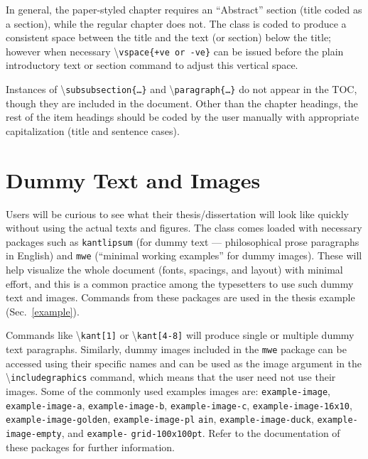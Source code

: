 \documentclass{article}
\newcommand\cmd[1]{\textbackslash\texttt{#1}}
\begin{document}
In general,  the paper-styled chapter requires an ``Abstract'' section (title coded as a section),  while the regular chapter does not.  The class is coded to produce a consistent space between the title and the text (or section) below the title; however when necessary \cmd{vspace\{+ve or -ve\}} can be issued before the plain introductory text or section command to adjust this vertical space.  

Instances of \cmd{subsubsection\{\ldots\}} and \cmd{paragraph\{\ldots\}} do not appear in the TOC, though they are included in the document.  Other than the chapter headings,  the rest of the item headings should be coded by the user manually with appropriate capitalization (title and sentence cases).

\section{Dummy Text and Images} 
Users will be curious to see what their thesis/dissertation will look like quickly without using the actual texts and figures. The class comes loaded with necessary packages such as \texttt{kantlipsum} (for dummy text --- philosophical prose paragraphs in English) and \texttt{mwe} (``minimal working examples'' for dummy images). These will help visualize the whole document (fonts, spacings, and layout) with minimal effort, and this is a common practice among the typesetters to use such dummy text and images. Commands from these packages are used in the thesis example (Sec.~\ref{example}).

Commands like \cmd{kant[1]} or \cmd{kant[4-8]} will produce single or multiple dummy text paragraphs. Similarly, dummy images included in the \texttt{mwe} package can be accessed using their specific names and can be used as the image argument in the \cmd{includegraphics} command, which means that the user need not use their images. Some of the commonly used examples images are: \texttt{example-image}, \texttt{example-image-a}, \texttt{example-image-b}, \texttt{example-image-c}, \texttt{example-image-16x10}, \texttt{example-image-golden}, \texttt{example-image-pl} \texttt{ain}, \texttt{example-image-duck}, \texttt{example-image-empty}, and \texttt{example-} \texttt{grid-100x100pt}. Refer to the documentation of these packages for further information.
\end{document}
